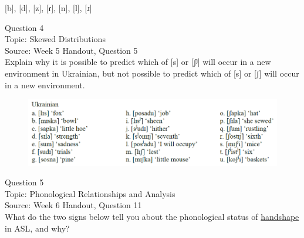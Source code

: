 \documentclass[12pt]{article}
\begin{document}
{[b]}, {[d]}, {[z]}, {[ɾ]}, {[n]}, {[l]}, {[ɹ]}


\newpage

{\large Question 4}\\

Topic: Skewed Distributions\\
Source: Week 5 Handout, Question 5\\

Explain why it is possible to predict which of [s] or [ʃʲ] will occur in a new environment in Ukrainian, but not possible to predict which of [s] or [ʃ] will occur in a new environment.\\

\begin{figure}[H]
\includegraphics{../images/ukrainian.png}
\end{figure}

\newpage

{\large Question 5}\\

Topic: Phonological Relationships and Analysis\\
Source: Week 6 Handout, Question 11\\

What do the two signs below tell you about the phonological status of \underline{handshape} in ASL, and why?\\
\end{document}

